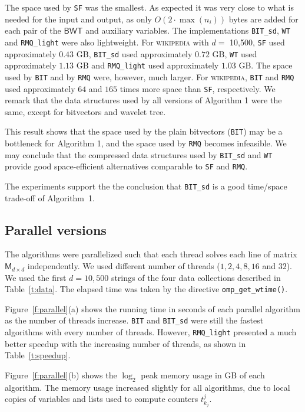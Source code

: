 \documentclass{elsarticle}
\newcommand{\BWT}{\ensuremath{\mathsf{BWT}}\xspace}
\newcommand{\Md}{\ensuremath{\mathsf{M}}\xspace}
\newcommand{\st}{\texttt{SF}\xspace}
\newcommand{\bit}{\texttt{BIT}\xspace}
\newcommand{\bitsd}{\texttt{BIT\_sd}\xspace}
\newcommand{\wt}{\texttt{WT}\xspace}
\newcommand{\gog}{\texttt{RMQ\_light}\xspace}
\newcommand{\gognz}{\texttt{RMQ}\xspace}
\begin{document}
The space used by \st was the smallest.  As expected it was very close to
what is needed for the input and output, as only $O(2 \cdot \max(n_i))$ bytes are
added for each pair of the \BWT and auxiliary variables.
The implementations \bitsd, \wt and \gog were also lightweight.
For \textsc{wikipedia} with $d=$ 10,500,
\st used approximately $0.43$ GB,
\bitsd used approximately $0.72$ GB,
\wt used approximately $1.13$ GB and
\gog used approximately $1.03$ GB.
The space used by \bit and by \gognz were, however, much larger.
For \textsc{wikipedia}, \bit and \gognz used approximately $64$
and $165$ times more space than \st, respectively.
We remark that the data structures used by all
versions of Algorithm 1 were the same, except for bitvectors and wavelet
tree.

This result shows that the space used by the plain bitvectors (\bit) may be
a bottleneck for Algorithm 1, and the space used by \gognz becomes infeasible.
We may conclude that the compressed data structures used by
\bitsd and \wt provide good space-efficient alternatives comparable to \st
and \gognz.

The experiments support the the conclusion that \bitsd is a good time/space
trade-off of Algorithm~1.

\subsection{Parallel versions}\label{s:parallel}

The
algorithms were parallelized such that each thread solves each line of
matrix $\Md_{d\times d}$ independently.  We used different number of
threads ($1, 2, 4, 8, 16$ and $32$).  We used the first $d=10,500$ strings
of the four data collections described in Table~\ref{t:data}.  The elapsed
time was taken by the directive \texttt{omp\_get\_wtime()}.


Figure~\ref{f:parallel}(a) shows the running time in seconds of each
parallel algorithm as the number of threads increase.
\bit and \bitsd were
still the fastest algorithms with every number of threads.
However, \gog presented a much better speedup with the
increasing number of threads, as shown in
Table~\ref{t:speedup}.

Figure~\ref{f:parallel}(b) shows the $\log_2$ peak memory usage in GB of
each algorithm.  The memory usage increased slightly for all algorithms, due to
local copies of variables and lists used to compute
counters $t^{j}_{k_j}$.
\end{document}
